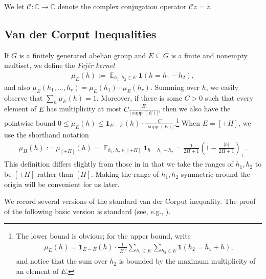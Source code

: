 \documentclass[11pt]{amsart}
\theoremstyle{definition}
\DeclareMathOperator*{\E}{\mathbb{E}}
\newcommand{\C}{{\mathbb C}}
\newcommand{\CC}{{\mathcal C}}
\DeclareMathOperator{\supp}{supp}
\newcommand{\brac}[1]{\mathopen{}\left( #1 \mathclose{}\right)}
\begin{document}
We let $\CC: \C \to \C$ denote the complex conjugation operator $\CC z=\overline{z}$.



\subsection{Van der Corput Inequalities}

If $G$ is a finitely generated abelian group and $E\subseteq G$ is a finite {and nonempty} multiset, we define the \textit{Fej\'er kernel}
\begin{align*}
    \mu_E(h) := \E_{h_1, h_2\in E}\mathbf{1}({h = h_1 - h_2}),
\end{align*}
and also $\mu_E(h_1, \ldots, h_r) = \mu_E(h_1)\cdots \mu_E(h_r)$.
Summing over $h$, we easily observe that $\sum_h \mu_E(h) = 1$. Moreover, if there is some $C>0$ such that every element of $E$ has multiplicity at most $C\frac{|E|}{|\supp(E)|}$, 
then we also have the pointwise bound $0\leq \mu_E(h)\leq \mathbf{1}_{E-E}(h)\cdot\frac{C}{|\supp(E)|}$.\footnote{The lower bound is obvious; for the upper bound, write
\begin{align*}
    \mu_E(h) = \mathbf{1}_{E-E}(h)\cdot\frac{1}{|E|^2}\sum_{h_1\in E}\sum_{h_2\in E}\mathbf{1}(h_2 = h_1 + h),
\end{align*}
and notice that the sum over $h_2$ is bounded by the maximum multiplicity of an element of $E$.} 
When $E = [\pm H]$, we use the shorthand notation
\begin{align*}
    \mu_H(h):=\mu_{[\pm H]}(h) = \E_{h_1, h_2\in[\pm H]} \mathbf{1}_{h = h_1 - h_2} = \frac{1}{2H+1}\brac{1-\frac{|h|}{2H+1}}_+.
\end{align*}
This definition differs slightly from those in \cite{Pel20, PP19, PP20, Pre17} in that we take the ranges of $h_1, h_2$ to be $[\pm H]$ rather than $[H]$. Making the range of $h_1, h_2$  symmetric around the origin will be convenient for us later.

We  record several versions of the standard van der Corput inequality.
The proof of the following basic version is standard (see, e.g., \cite[Lemma 3.2]{Pre17}).
\end{document}
